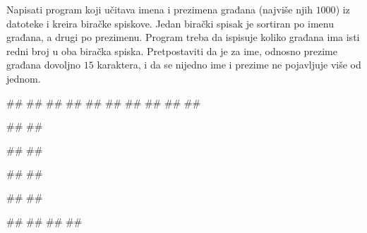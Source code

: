 \begin{Answer}[ref=3_19]
\end{Answer}
\begin{Exercise}[label=3_20]
  Napisati program koji učitava imena i prezimena građana (najviše
  njih $1000$) iz datoteke  i kreira biračke
  spiskove. Jedan birački spisak je sortiran po imenu građana, a drugi
  po prezimenu. Program treba da ispisuje koliko građana ima isti
  redni broj u oba biračka spiska. Pretpostaviti da je za ime, odnosno
  prezime građana dovoljno $15$ karaktera, i da se nijedno ime i
  prezime ne pojavljuje više od jednom.

\begin{minitest}
\begin{test}{1}
##    
##
##
##
##
##
##
##
##
##

#\naslovIzlaz#
##
\end{test}
\end{minitest}
\begin{minitest}
\begin{test}{2}
##
##
  
#\naslovIzlaz#
##
\end{test}
\end{minitest}
\begin{minitest}
\begin{test}{3}
##
##
  
#\naslovIzlazZaGresku#
##
##
##
\end{test}
\end{minitest}
  
\end{Exercise}

